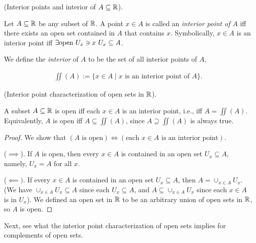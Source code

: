 \begin{defn}
    (Interior points and interior of $A \subseteq \mathbb{R}$).
    
    Let $A \subseteq \mathbb{R}$ be any subset of $\mathbb{R}$. A point $x \in A$ is called an \textit{interior point of $A$} iff there exists an open set contained in $A$ that contains $x$. Symbolically, $x \in A$ is an interior point iff ${\exists \text{open } U_x \ni x \text{ } U_x \subseteq A}$. 
    
    We define the \textit{interior} of $A$ to be the set of all interior points of $A$,
    
    \begin{align*}
        \iint(A) := \{ x \in A \mid \text{$x$ is an interior point of $A$} \}.
    \end{align*}
\end{defn}

\begin{theorem}
    (Interior point characterization of open sets in $\mathbb{R}$).
    
    A subset $A \subseteq \mathbb{R}$ is open iff each $x \in A$ is an interior point, i.e., iff $A = \iint(A)$. Equivalently, $A$ is open iff $A \subseteq \iint(A)$, since $A \supseteq \iint(A)$ is always true.
\end{theorem}

\begin{proof}
    We show that $(\text{$A$ is open}) \iff (\text{each $x \in A$ is an interior point})$.
    
    ($\implies$). If $A$ is open, then every $x \in A$ is contained in an open set $U_x \subseteq A$, namely, $U_x = A$ for all $x$.
    
    ($\impliedby)$. If every $x \in A$ is contained in an open set $U_x \subseteq A$, then $A = \cup_{x \in A} U_x$. (We have $\cup_{x \in A} U_x \subseteq A$ since each $U_x \subseteq A$, and $A \subseteq \cup_{x \in A} U_x$ since each $x \in A$ is in $U_x$). We defined an open set in $\mathbb{R}$ to be an arbitrary union of open sets in $\mathbb{R}$, so $A$ is open. 
\end{proof}

Next, see what the interior point characterization of open sets implies for complements of open sets.

